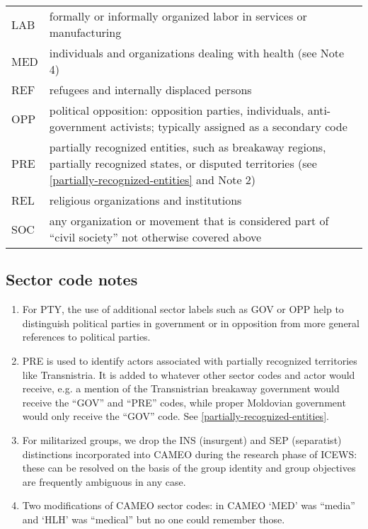 \documentclass[11pt]{report}
\begin{document}
\begin{center}
\begin{longtable}{|l|p{13cm}|}
      LAB & formally or informally organized labor in services or manufacturing \\
	  MED & individuals and organizations dealing with health (see Note 4) \\
	  REF & refugees and internally displaced persons \\
	  OPP & political opposition: opposition parties, individuals, anti-government activists; typically assigned as a secondary code \\
      PRE & partially recognized entities, such as breakaway regions, partially recognized states, or disputed territories (see \autoref{partially-recognized-entities} and Note 2)  \\
	  REL & religious organizations and institutions \\
	  SOC & any organization or movement that is considered part of ``civil society''  not otherwise covered above\\
  \hline
\end{longtable}
\end{center}

\subsection{Sector code notes}

\begin{enumerate}
\item For PTY, the use of additional sector labels such as GOV or OPP help to distinguish political parties in government or in opposition from more general references to political parties.
\item PRE is used to identify actors associated with partially recognized territories like Transnistria. It is added to whatever other sector codes and actor would receive, e.g. a mention of the Transnistrian breakaway government would receive the ``GOV'' and ``PRE'' codes, while proper Moldovian government would only receive the ``GOV'' code. See \autoref{partially-recognized-entities}.
\item For militarized groups, we drop the INS (insurgent) and SEP (separatist) distinctions incorporated into CAMEO during the research phase of ICEWS: these can be resolved on the basis of the group identity and group objectives are frequently ambiguous in any case.
\item Two modifications of CAMEO sector codes: in CAMEO `MED' was ``media'' and `HLH' was ``medical'' but no one could remember those.
\end{enumerate}
\end{document}
